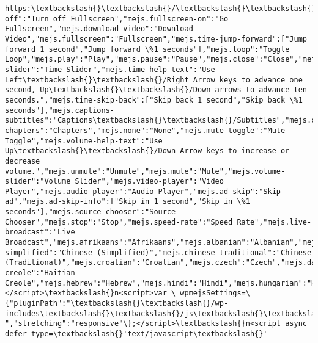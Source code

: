 \documentclass[11pt]{article}
\begin{document}
\begin{Verbatim}[commandchars=\\\{\}]
https:\textbackslash{}\textbackslash{}/\textbackslash{}\textbackslash{}/get.adobe.com\textbackslash{}\textbackslash{}/flashplayer\textbackslash{}\textbackslash{}/","mejs.fullscreen-off":"Turn off Fullscreen","mejs.fullscreen-on":"Go Fullscreen","mejs.download-video":"Download Video","mejs.fullscreen":"Fullscreen","mejs.time-jump-forward":["Jump forward 1 second","Jump forward \%1 seconds"],"mejs.loop":"Toggle Loop","mejs.play":"Play","mejs.pause":"Pause","mejs.close":"Close","mejs.time-slider":"Time Slider","mejs.time-help-text":"Use Left\textbackslash{}\textbackslash{}/Right Arrow keys to advance one second, Up\textbackslash{}\textbackslash{}/Down arrows to advance ten seconds.","mejs.time-skip-back":["Skip back 1 second","Skip back \%1 seconds"],"mejs.captions-subtitles":"Captions\textbackslash{}\textbackslash{}/Subtitles","mejs.captions-chapters":"Chapters","mejs.none":"None","mejs.mute-toggle":"Mute Toggle","mejs.volume-help-text":"Use Up\textbackslash{}\textbackslash{}/Down Arrow keys to increase or decrease volume.","mejs.unmute":"Unmute","mejs.mute":"Mute","mejs.volume-slider":"Volume Slider","mejs.video-player":"Video Player","mejs.audio-player":"Audio Player","mejs.ad-skip":"Skip ad","mejs.ad-skip-info":["Skip in 1 second","Skip in \%1 seconds"],"mejs.source-chooser":"Source Chooser","mejs.stop":"Stop","mejs.speed-rate":"Speed Rate","mejs.live-broadcast":"Live Broadcast","mejs.afrikaans":"Afrikaans","mejs.albanian":"Albanian","mejs.arabic":"Arabic","mejs.belarusian":"Belarusian","mejs.bulgarian":"Bulgarian","mejs.catalan":"Catalan","mejs.chinese":"Chinese","mejs.chinese-simplified":"Chinese (Simplified)","mejs.chinese-traditional":"Chinese (Traditional)","mejs.croatian":"Croatian","mejs.czech":"Czech","mejs.danish":"Danish","mejs.dutch":"Dutch","mejs.english":"English","mejs.estonian":"Estonian","mejs.filipino":"Filipino","mejs.finnish":"Finnish","mejs.french":"French","mejs.galician":"Galician","mejs.german":"German","mejs.greek":"Greek","mejs.haitian-creole":"Haitian Creole","mejs.hebrew":"Hebrew","mejs.hindi":"Hindi","mejs.hungarian":"Hungarian","mejs.icelandic":"Icelandic","mejs.indonesian":"Indonesian","mejs.irish":"Irish","mejs.italian":"Italian","mejs.japanese":"Japanese","mejs.korean":"Korean","mejs.latvian":"Latvian","mejs.lithuanian":"Lithuanian","mejs.macedonian":"Macedonian","mejs.malay":"Malay","mejs.maltese":"Maltese","mejs.norwegian":"Norwegian","mejs.persian":"Persian","mejs.polish":"Polish","mejs.portuguese":"Portuguese","mejs.romanian":"Romanian","mejs.russian":"Russian","mejs.serbian":"Serbian","mejs.slovak":"Slovak","mejs.slovenian":"Slovenian","mejs.spanish":"Spanish","mejs.swahili":"Swahili","mejs.swedish":"Swedish","mejs.tagalog":"Tagalog","mejs.thai":"Thai","mejs.turkish":"Turkish","mejs.ukrainian":"Ukrainian","mejs.vietnamese":"Vietnamese","mejs.welsh":"Welsh","mejs.yiddish":"Yiddish"\}\};</script>\textbackslash{}n<script>var \_wpmejsSettings=\{"pluginPath":"\textbackslash{}\textbackslash{}/wp-includes\textbackslash{}\textbackslash{}/js\textbackslash{}\textbackslash{}/mediaelement\textbackslash{}\textbackslash{}/","classPrefix":"mejs-","stretching":"responsive"\};</script>\textbackslash{}n<script async defer type=\textbackslash{}'text/javascript\textbackslash{}' 
\end{Verbatim}
\end{document}
